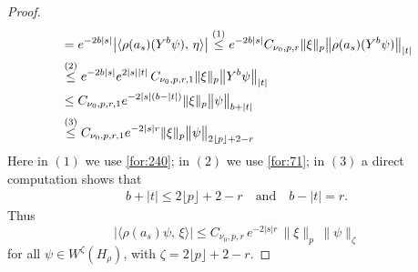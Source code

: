 \documentclass[11 pt]{amsart}
\theoremstyle{definition}
\numberwithin{equation}{section}
\begin{document}
\begin{proof}
\begin{align}
 &=e^{-2b|s|}\big|\langle \rho(a_s)(Y^b\psi),\, \eta\rangle \big|\overset{\text{(1)}}{\leq} e^{-2b|s|} C_{\nu_0,p,r} \| \xi \|_{p} \big\|\rho(a_s)(Y^b\psi)\big\|_{|t|}\notag\\
 &\overset{\text{(2)}}{\leq} e^{-2b|s|} e^{2|s||t|}\,C_{\nu_0,p,r,1} \| \xi \|_{p} \big\|Y^b\psi\big\|_{|t|}\notag\\
 &\leq C_{\nu_0,p,r,1} e^{-2|s|(b-|t|)}  \| \xi \|_{p} \big\|\psi\big\|_{b+|t|}\notag\\
 &\overset{\text{(3)}}{\leq} C_{\nu_0,p,r,1} e^{-2|s|r}  \| \xi \|_{p} \big\|\psi\big\|_{2\lfloor p\rfloor+2-r}
\end{align}
Here in $(1)$ we use \eqref{for:240}; in $(2)$ we use \eqref{for:71}; in $(3)$ a direct computation shows that
\begin{align*}
 b+|t|\leq2\lfloor p\rfloor+2-r\quad\text{and}\quad b-|t|=r.
\end{align*}
Thus
\[
  \big|\langle \rho(a_s)\psi,\, \xi\rangle \big|
  \leq C_{\nu_0,p,r}\, e^{-2|s|r}\,\|\xi\|_{p}\,\|\psi\|_{\zeta}
\]
for all $\psi\in W^{\zeta}(H_\rho)$, with $\zeta=2\lfloor p\rfloor+2-r$.


\end{proof}
\end{document}
